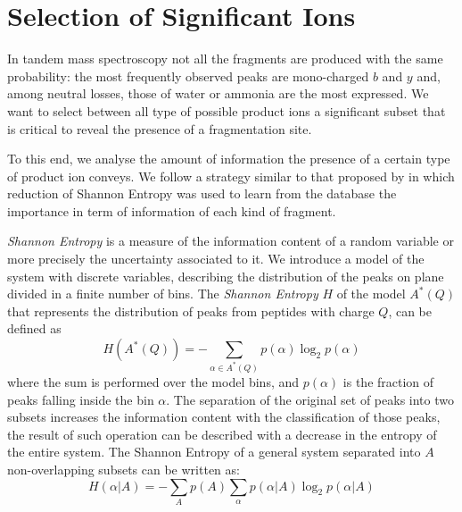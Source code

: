 \section{Selection of Significant Ions}
\label{sec:shannon}


In tandem mass spectroscopy not all the fragments are produced with the same
probability: the most frequently observed peaks are mono-charged $b$ and $y$
and, among neutral losses, those of water or ammonia are the most expressed.
We want to select between all type of possible product ions a significant subset
that is critical to reveal the presence of a fragmentation site.


To this end, we analyse the amount of information the presence of a certain type of product ion conveys.
We follow a strategy similar to that proposed by \citet{gygi2004nature} %
in which reduction of Shannon Entropy was used to learn from the database the importance in term of information of each kind of fragment.

\emph{Shannon Entropy} \cite{shannon1948} is a measure of the
information content of a random variable or more precisely the uncertainty
associated to it.
We introduce a model of the system with discrete variables, describing the
distribution of the peaks on plane divided in a finite number of bins.
The \emph{Shannon Entropy} $H$ of the model $A^*(Q)$ that represents the
distribution of peaks from peptides with charge $Q$, can be defined as
\begin{equation}
 H(A^*(Q))=-\sum_{\alpha\in A^*(Q)} p(\alpha)\log_2 p(\alpha)
\label{eq:shannon}
\end{equation}
where the sum is performed over the model bins, and $p(\alpha)$ is the fraction
of peaks falling inside the bin $\alpha$.
The separation of the original set of peaks into two subsets increases the
information content with the classification of those peaks, the result of such
operation can be described with a decrease in the entropy of the entire system.
The Shannon Entropy of a general system separated into $A$ non-overlapping
subsets can be written as:
\begin{equation}
 H(\alpha|A)=-\sum_A p(A)\sum_\alpha p(\alpha|A)\log_2 p(\alpha|A)
\end{equation}

